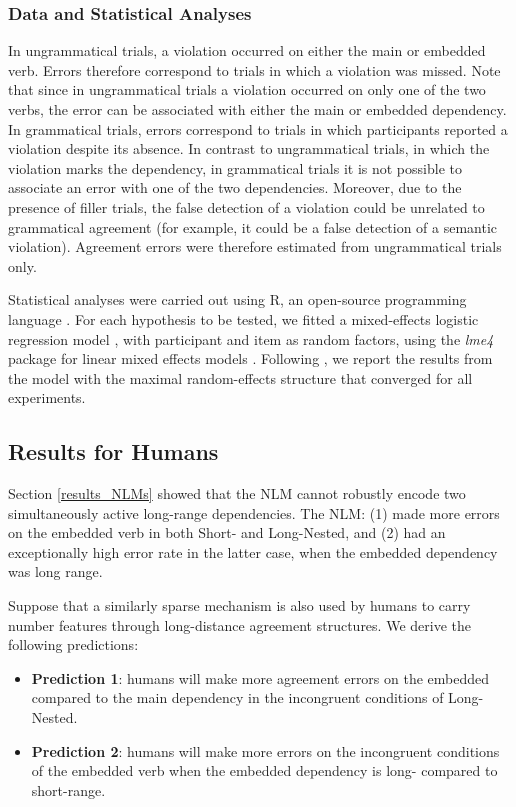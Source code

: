 \subsubsection{Data and Statistical Analyses}
In ungrammatical trials, a violation occurred on either the main or embedded verb. Errors therefore correspond to trials in which a violation was missed. Note that since in ungrammatical trials a violation occurred on only one of the two verbs, the error can be associated with either the main or embedded dependency. In grammatical trials, errors correspond to trials in which participants reported a violation despite its absence. In contrast to ungrammatical trials, in which the violation marks the dependency, in grammatical trials it is not possible to associate an error with one of the two dependencies. Moreover, due to the presence of filler trials, the false detection of a violation could be unrelated to grammatical agreement (for example, it could be a false detection of a semantic violation). Agreement errors were therefore estimated from ungrammatical trials only.

Statistical analyses were carried out using R, an open-source programming language \citep{team2013r}. For each hypothesis to be tested, we fitted a mixed-effects logistic regression model \citep{jaeger2008categorical}, with participant and item as random factors, using the \textit{lme4} package for linear mixed effects models \citep{bates2015lme4}. Following \citet{Baayen:etal:2008}, we report the results from the model with the maximal random-effects structure that converged for all experiments. 


\subsection{Results for Humans}
Section \ref{results_NLMs} showed that the NLM cannot robustly encode two simultaneously active long-range dependencies. The NLM: (1) made more errors on the embedded verb in both Short- and Long-Nested, and (2) had an exceptionally high error rate in the latter case, when the embedded dependency was long range.

Suppose that a similarly sparse mechanism is also used by humans to carry number features through long-distance agreement structures. We derive the following predictions:

\begin{itemize}
    \item \textbf{Prediction 1}: humans will make more agreement errors on the embedded compared to the main dependency in the incongruent conditions of Long-Nested. 
    \item \textbf{Prediction 2}: humans will make more errors on the incongruent conditions of the embedded verb when the embedded dependency is long- compared to short-range.
\end{itemize}

